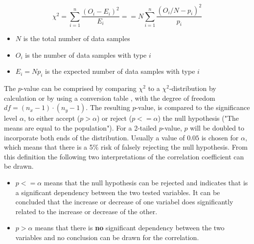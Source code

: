 \documentclass[a4paper,12pt]{report}
\begin{document}
\smallskip


\begin{equation}
\label{formula_chi_squared_simplified}	
	\chi^2 = \sum_{i=1}^{n}{\frac{(O_i-E_i)^2}{E_i}} == N\sum_{i=1}^{n}{\frac{(O_i/N-p_i)^2}{p_i}}
\end{equation}

\begin{itemize}
	\setlength\itemsep{0.1em}	
	\item[] $N$ is the total number of data samples 
	\item[] $O_i$ is the number of data samples with type $i$
	\item[] $E_i = N p_i$ is the expected number of data samples with type $i$
\end{itemize}

The $p$-value can be comprised by comparing $\chi^2$ to a $\chi^2$-distribution by calculation or by using a conversion table \cite{Piegorsch2002}, with the degree of freedom $df = (n_x - 1) \cdot (n_y - 1)$. The resulting  $p$-value, is compared to the significance level $\alpha$, to either accept ($p > \alpha$) or reject ($p <= \alpha$) the null hypothesis ("The means are equal to the population"). For a 2-tailed $p$-value, $p$ will be doubled to incorporate both ends of the distribution. Usually a value of $0.05$ is chosen for $\alpha$, which means that there is a 5\% risk of falsely rejecting the null hypothesis. From this definition the following two interpretations of the correlation coefficient can be drawn. \cite{OTSD2020}

\begin{itemize}
	\item $p <= \alpha$ means that the null hypothesis can be rejected and indicates that is a significant dependency between the two tested variables. It can be concluded that the increase or decrease of one variabel does significantly related to the increase or decrease of the other.
	\item $p > \alpha$ means that there is \textbf{no} significant dependency between the two variables and no conclusion can be drawn for the correlation.
\end{itemize}
\end{document}
